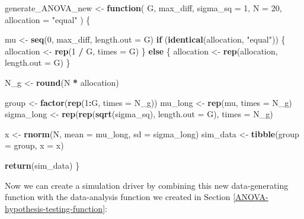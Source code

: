 \documentclass[
]{book}
\newenvironment{Shaded}{\begin{snugshade}}{\end{snugshade}}
\newcommand{\AttributeTok}[1]{\textcolor[rgb]{0.13,0.29,0.53}{#1}}
\newcommand{\ControlFlowTok}[1]{\textcolor[rgb]{0.13,0.29,0.53}{\textbf{#1}}}
\newcommand{\DecValTok}[1]{\textcolor[rgb]{0.00,0.00,0.81}{#1}}
\newcommand{\FunctionTok}[1]{\textcolor[rgb]{0.13,0.29,0.53}{\textbf{#1}}}
\newcommand{\NormalTok}[1]{#1}
\newcommand{\OtherTok}[1]{\textcolor[rgb]{0.56,0.35,0.01}{#1}}
\newcommand{\SpecialCharTok}[1]{\textcolor[rgb]{0.81,0.36,0.00}{\textbf{#1}}}
\newcommand{\StringTok}[1]{\textcolor[rgb]{0.31,0.60,0.02}{#1}}
\begin{document}
\begin{Shaded}
\begin{Highlighting}[]
\NormalTok{generate\_ANOVA\_new }\OtherTok{\textless{}{-}} \ControlFlowTok{function}\NormalTok{(}
\NormalTok{  G, max\_diff, }\AttributeTok{sigma\_sq =} \DecValTok{1}\NormalTok{, }\AttributeTok{N =} \DecValTok{20}\NormalTok{, }\AttributeTok{allocation =} \StringTok{"equal"}
\NormalTok{) \{}
  
\NormalTok{  mu }\OtherTok{\textless{}{-}} \FunctionTok{seq}\NormalTok{(}\DecValTok{0}\NormalTok{, max\_diff, }\AttributeTok{length.out =}\NormalTok{ G)}
  \ControlFlowTok{if}\NormalTok{ (}\FunctionTok{identical}\NormalTok{(allocation, }\StringTok{"equal"}\NormalTok{)) \{}
\NormalTok{    allocation }\OtherTok{\textless{}{-}} \FunctionTok{rep}\NormalTok{(}\DecValTok{1} \SpecialCharTok{/}\NormalTok{ G, }\AttributeTok{times =}\NormalTok{ G) }
\NormalTok{  \} }\ControlFlowTok{else}\NormalTok{ \{}
\NormalTok{    allocation }\OtherTok{\textless{}{-}} \FunctionTok{rep}\NormalTok{(allocation, }\AttributeTok{length.out =}\NormalTok{ G)}
\NormalTok{  \}}
  
\NormalTok{  N\_g }\OtherTok{\textless{}{-}} \FunctionTok{round}\NormalTok{(N }\SpecialCharTok{*}\NormalTok{ allocation)  }
  
\NormalTok{  group }\OtherTok{\textless{}{-}} \FunctionTok{factor}\NormalTok{(}\FunctionTok{rep}\NormalTok{(}\DecValTok{1}\SpecialCharTok{:}\NormalTok{G, }\AttributeTok{times =}\NormalTok{ N\_g))}
\NormalTok{  mu\_long }\OtherTok{\textless{}{-}} \FunctionTok{rep}\NormalTok{(mu, }\AttributeTok{times =}\NormalTok{ N\_g)}
\NormalTok{  sigma\_long }\OtherTok{\textless{}{-}} \FunctionTok{rep}\NormalTok{(}\FunctionTok{rep}\NormalTok{(}\FunctionTok{sqrt}\NormalTok{(sigma\_sq), }\AttributeTok{length.out =}\NormalTok{ G), }\AttributeTok{times =}\NormalTok{ N\_g)}
  
\NormalTok{  x }\OtherTok{\textless{}{-}} \FunctionTok{rnorm}\NormalTok{(N, }\AttributeTok{mean =}\NormalTok{ mu\_long, }\AttributeTok{sd =}\NormalTok{ sigma\_long)}
\NormalTok{  sim\_data }\OtherTok{\textless{}{-}} \FunctionTok{tibble}\NormalTok{(}\AttributeTok{group =}\NormalTok{ group, }\AttributeTok{x =}\NormalTok{ x)}
  
  \FunctionTok{return}\NormalTok{(sim\_data)}
\NormalTok{\}}
\end{Highlighting}
\end{Shaded}

Now we can create a simulation driver by combining this new data-generating function with the data-analysis function we created in Section \ref{ANOVA-hypothesis-testing-function}:
\end{document}
